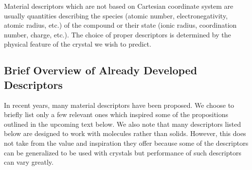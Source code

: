 \documentclass[11pt,oneside,czech,american]{book} %
\theoremstyle{plain}
\theoremstyle{definition}
\begin{document}
Material descriptors which are not based on Cartesian coordinate system are usually quantities describing the species (atomic number, electronegativity, atomic radius, etc.) of the compound or their state (ionic radius, coordination number, charge, etc.). The choice of proper descriptors is determined by the physical feature of the crystal we wish to predict. 

\subsection{Brief Overview of Already Developed Descriptors} \label{developed}
In recent years, many material descriptors have been proposed. We choose to briefly list only a few relevant ones which inspired some of the propositions outlined in the upcoming text below. We also note that many descriptors listed below are designed to work with molecules rather than solids. However, this does not take from the value and inspiration they offer because some of the descriptors can be generalized to be used with crystals but performance of such descriptors can vary greatly.
\end{document}
